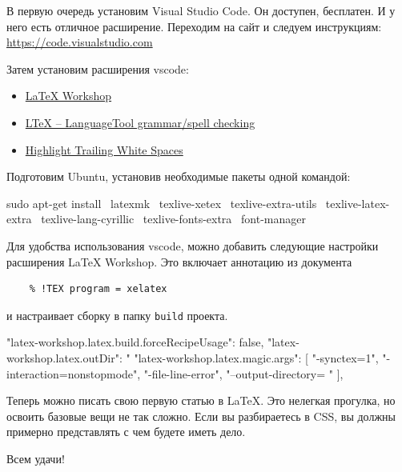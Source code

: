 \documentclass{article}
\begin{document}
    В первую очередь установим Visual Studio Code. Он доступен, бесплатен.
    И у него есть отличное расширение. Переходим на сайт и следуем инструкциям:
    \href{https://code.visualstudio.com}{https://code.visualstudio.com}

    Затем установим расширения vscode:

    \begin{itemize}
        \item \href{https://marketplace.visualstudio.com/items?itemName=James-Yu.latex-workshop}{LaTeX Workshop}
        \item \href{https://marketplace.visualstudio.com/items?itemName=valentjn.vscode-ltex}{LTeX – LanguageTool grammar/spell checking}
        \item \href{https://marketplace.visualstudio.com/items?itemName=ybaumes.highlight-trailing-white-spaces}{Highlight Trailing White Spaces}
    \end{itemize}

    Подготовим Ubuntu, установив необходимые пакеты одной командой:

    \begin{spverbatim}
sudo apt-get install \
    latexmk \
    texlive-xetex \
    texlive-extra-utils \
    texlive-latex-extra \
    texlive-lang-cyrillic \
    texlive-fonts-extra \
    font-manager
    \end{spverbatim}

    Для удобства использования vscode, можно добавить следующие настройки расширения LaTeX Workshop.
    Это включает аннотацию из документа
    \begin{verbatim}
    % !TEX program = xelatex
    \end{verbatim}
    и настраивает сборку в папку \texttt{build} проекта.

    \begin{spverbatim}
    "latex-workshop.latex.build.forceRecipeUsage": false,
    "latex-workshop.latex.outDir": "%
    "latex-workshop.latex.magic.args": [
        "-synctex=1",
        "-interaction=nonstopmode",
        "-file-line-error",
        "--output-directory=%
        "%
    ],
    \end{spverbatim}

    Теперь можно писать свою первую статью в \LaTeX{}.
    Это нелегкая прогулка, но освоить базовые вещи не так сложно.
    Если вы разбираетесь в CSS, вы должны примерно представлять с чем будете иметь дело.

    \vspace{3mm}
    Всем удачи!

    \newpage
    \tableofcontents
\end{document}
